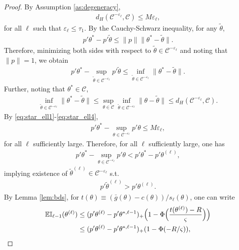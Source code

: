 \documentclass[letterpaper,11pt]{article}
\theoremstyle{myplain}
\theoremstyle{mydefinition}
\theoremstyle{myremark}
\numberwithin{equation}{section}
\numberwithin{figure}{section}
\begin{document}
\begin{appendix}
\begin{proof}
By Assumption \ref{as:degeneracy},
\begin{align}
d_H(\mathcal C^{-\varepsilon_\ell},\mathcal C)\le M \varepsilon_\ell,\label{eq:star_ell1}
\end{align}
for all $\ell$ such that $\varepsilon_\ell\le \tau_1$.
By the Cauchy-Schwarz inequality, for any $\tilde\theta$,
\begin{align}
p'\theta^*-p'\tilde\theta\le \|p\|\|\theta^*-\tilde\theta\|.\label{eq:star_ell2}
\end{align}
Therefore, minimizing both sides with respect to $\tilde \theta\in \mathcal C^{-\varepsilon_\ell}$ and noting that $\|p\|=1$, we obtain
\begin{align}
p'\theta^*-\sup_{\tilde\theta\in \mathcal C^{-\varepsilon_\ell}}p'\tilde\theta \le \inf_{\tilde\theta\in \mathcal C^{-\varepsilon_\ell}}\|\theta^*-\tilde\theta\|.\label{eq:star_ell3}
\end{align}
Further, noting that $\theta^*\in\mathcal C$,
\begin{align}
\inf_{\tilde\theta\in \mathcal C^{-\varepsilon_\ell}}\|\theta^*-\tilde\theta\|\le \sup_{\theta\in\mathcal C}\inf_{\tilde\theta\in \mathcal C^{-\varepsilon_\ell}}\|\theta-\tilde\theta\|\le d_H(\mathcal C^{-\varepsilon_\ell},\mathcal C).\label{eq:star_ell4}
\end{align}
By \eqref{eq:star_ell1}-\eqref{eq:star_ell4},
\begin{align}
p'\theta^*-\sup_{\theta\in \mathcal C^{-\varepsilon_\ell}} p'\theta \le M \varepsilon_\ell,\label{eq:star_ell5}
\end{align}
for all $\ell$ sufficiently large.
Therefore, for all $\ell$ sufficiently large, one has
\begin{align}
p'\theta^*-\sup_{\theta\in \mathcal C^{-\varepsilon_\ell}} p'\theta  <p'\theta^*-p'\theta^{(\ell)}, \label{eq:star_ell6}
\end{align}
implying existence of $\tilde \theta^{(\ell)}\in\mathcal C^{-\varepsilon_\ell}$ s.t.
\begin{align}
p'\tilde\theta^{(\ell)}>p'\theta^{(\ell)}.\label{eq:star_ell7}
\end{align}
By Lemma \ref{lem:bds}, for $t(\theta)\equiv (\bar g(\theta)-c(\theta))/s_\ell(\theta)$, one can write
\begin{align}
\mathbb{EI}_{\ell-1}(\theta^{(\ell)}) &\le (p'\theta^{(\ell)}-p'\theta^{*,\ell-1})_+\Bigl(1-\Phi\Bigl(\frac{t(\theta^{(\ell)})-R}{\varsigma}\Bigr)\Bigr)\\
&\le (p'\theta^{(\ell)}-p'\theta^{*,\ell-1})_+(1-\Phi(-R/\varsigma)), \label{eq:star_ell8}

\end{align}
\end{proof}
\end{appendix}
\end{document}
